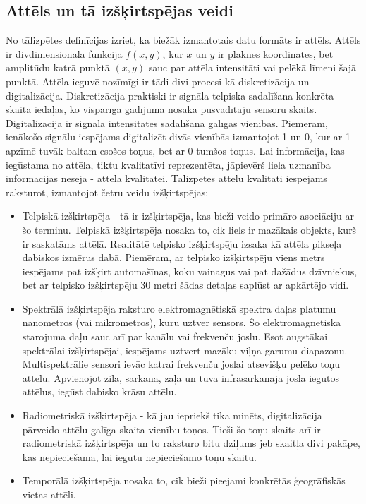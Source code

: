 \documentclass[12pt,paper=a4]{report}
\begin{document}
\subsection{Attēls un tā izšķirtspējas veidi}
No tālizpētes definīcijas izriet, ka biežāk izmantotais datu formāts ir attēls. Attēls ir divdimensionāla funkcija \(f(x,y)\), kur \(x\) un \(y\) ir plaknes koordinātes, bet amplitūdu katrā punktā \((x,y)\) sauc par attēla intensitāti vai pelēkā līmeni šajā punktā. Attēla ieguvē nozīmīgi ir tādi divi procesi kā diskretizācija un digitalizācija. Diskretizācija praktiski ir signāla telpiska sadalīšana konkrēta skaita iedaļās, ko vispārīgā gadījumā nosaka pusvadītāju sensoru skaits. Digitalizācija ir signāla intensitātes sadalīšana galīgās vienībās. Piemēram, ienākošo signālu iespējams digitalizēt divās vienībās izmantojot 1 un 0, kur ar 1 apzīmē tuvāk baltam esošos toņus, bet ar 0 tumšos toņus. Lai informācija, kas iegūstama no attēla, tiktu kvalitatīvi reprezentēta, jāpievērš liela uzmanība informācijas nesēja - attēla kvalitātei. Tālizpētes attēlu kvalitāti iespējams raksturot, izmantojot četru veidu izšķirtspējas:
\begin{itemize}
\item Telpiskā izšķirtspēja - tā ir izšķirtspēja, kas bieži veido primāro asociāciju ar šo terminu. Telpiskā izšķirtspēja nosaka to, cik liels ir mazākais objekts, kurš ir saskatāms attēlā. Realitātē telpisko izšķirtspēju izsaka kā attēla pikseļa dabiskos izmērus dabā. Piemēram, ar telpisko izšķirtspēju viens metrs iespējams pat izšķirt automašīnas, koku vainagus vai pat dažādus dzīvniekus, bet ar telpisko izšķirtspēju 30 metri šādas detaļas saplūst ar apkārtējo vidi.
\item Spektrālā izšķirtspēja raksturo elektromagnētiskā spektra daļas platumu nanometros (vai mikrometros), kuru uztver sensors. Šo elektromagnētiskā starojuma daļu sauc arī par kanālu vai frekvenču joslu. Esot augstākai spektrālai izšķirtspējai, iespējams uztvert mazāku viļņa garumu diapazonu. Multispektrālie sensori ievāc katrai frekvenču joslai atsevišķu pelēko toņu attēlu. Apvienojot zilā, sarkanā, zaļā un tuvā infrasarkanajā joslā iegūtos attēlus, iegūst dabisko krāsu attēlu. 
\item Radiometriskā izšķirtspēja - kā jau iepriekš tika minēts, digitalizācija pārveido attēlu galīga skaita vienību toņos. Tieši šo toņu skaits arī ir radiometriskā izšķirtspēja un to raksturo bitu dziļums jeb skaitļa divi pakāpe, kas nepieciešama, lai iegūtu nepieciešamo toņu skaitu.
\item Temporālā izšķirtspēja nosaka to, cik bieži pieejami konkrētās ģeogrāfiskās vietas attēli. \cite{gonzalez2002digital}
\end{itemize}
\end{document}
